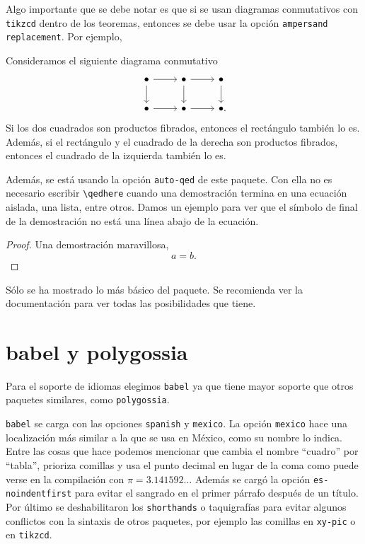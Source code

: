 Algo importante que se debe notar es que si se usan diagramas conmutativos
con \texttt{tikzcd} dentro de los teoremas, entonces se debe usar la opción
\texttt{ampersand replacement}. Por ejemplo,

\begin{theorem}[note=Lema del producto fibrado]
  Consideramos el siguiente diagrama conmutativo
  \begin{equation*}
    \begin{tikzcd}[ampersand replacement=\&]
      \bullet\ar[r]\ar[d] \& \bullet\ar[r]\ar[d] \& \bullet\ar[d]\\
      \bullet\ar[r] \& \bullet\ar[r] \& \bullet\mathrlap{.}
    \end{tikzcd}
  \end{equation*}
  Si los dos cuadrados son productos fibrados, entonces el rectángulo también lo
  es. Además, si el rectángulo y el cuadrado de la derecha son productos fibrados,
  entonces el cuadrado de la izquierda también lo es.
\end{theorem}

Además, se está usando la opción \texttt{auto-qed} de este paquete. Con ella no
es necesario escribir \verb|\qedhere| cuando una demostración termina en una
ecuación aislada, una lista, entre otros. Damos un ejemplo para ver que el
símbolo de final de la demostración no está una línea abajo de la ecuación.

\begin{proof}
  Una demostración maravillosa,
  \begin{equation*}
    a=b.
  \end{equation*}
\end{proof}

Sólo se ha mostrado lo más básico del paquete. Se recomienda ver la
documentación para ver todas las posibilidades que tiene.

\listofkeytheorems 


\section{babel y polygossia}%
\label{sec:babel}
Para el soporte de idiomas elegimos \texttt{babel} ya que tiene mayor soporte que otros paquetes similares, como \texttt{polygossia}.

\texttt{babel} se carga con las opciones \texttt{spanish} y
\texttt{mexico}. La opción \texttt{mexico} hace una localización más similar
a la que se usa en México, como su nombre lo indica. Entre las cosas que
hace podemos mencionar que cambia el nombre \enquote{cuadro} por \enquote{tabla},
prioriza comillas y usa el punto decimal en lugar de la coma como puede
verse en la compilación con \(\pi=3.141592\ldots \) Además se
cargó la opción \texttt{es-noindentfirst} para evitar el sangrado en el
primer párrafo después de un título. Por
último se deshabilitaron los \texttt{shorthands} o taquigrafías para evitar
algunos conflictos con la sintaxis de otros paquetes, por ejemplo las
comillas en \texttt{xy-pic} o en \texttt{tikzcd}.


